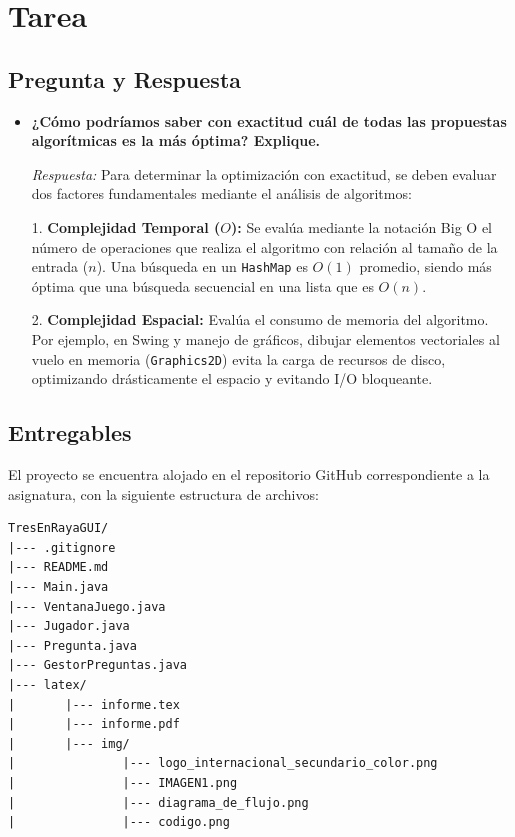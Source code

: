\documentclass{article}
\begin{document}
\section{Tarea}
 
\subsection{Pregunta y Respuesta}
\begin{itemize}
	\item \textbf{¿Cómo podríamos saber con exactitud cuál de todas las propuestas algorítmicas es la más óptima? Explique.}
	
	\textit{Respuesta:} Para determinar la optimización con exactitud, se deben evaluar dos factores fundamentales mediante el análisis de algoritmos:
	
	1. \textbf{Complejidad Temporal ($O$):} Se evalúa mediante la notación Big O el número de operaciones que realiza el algoritmo con relación al tamaño de la entrada ($n$). Una búsqueda en un \texttt{HashMap} es $O(1)$ promedio, siendo más óptima que una búsqueda secuencial en una lista que es $O(n)$.
	
	2. \textbf{Complejidad Espacial:} Evalúa el consumo de memoria del algoritmo. Por ejemplo, en Swing y manejo de gráficos, dibujar elementos vectoriales al vuelo en memoria (\texttt{Graphics2D}) evita la carga de recursos de disco, optimizando drásticamente el espacio y evitando I/O bloqueante.
\end{itemize}
 
\clearpage
 
\subsection{Entregables}
El proyecto se encuentra alojado en el repositorio GitHub correspondiente a la asignatura, con la siguiente estructura de archivos:
 
\begin{lstlisting}[style=ascii-tree]
TresEnRayaGUI/
|--- .gitignore
|--- README.md
|--- Main.java
|--- VentanaJuego.java
|--- Jugador.java
|--- Pregunta.java
|--- GestorPreguntas.java
|--- latex/
|       |--- informe.tex
|       |--- informe.pdf
|       |--- img/
|               |--- logo_internacional_secundario_color.png
|               |--- IMAGEN1.png
|               |--- diagrama_de_flujo.png
|               |--- codigo.png
\end{lstlisting}
 
\end{document}

